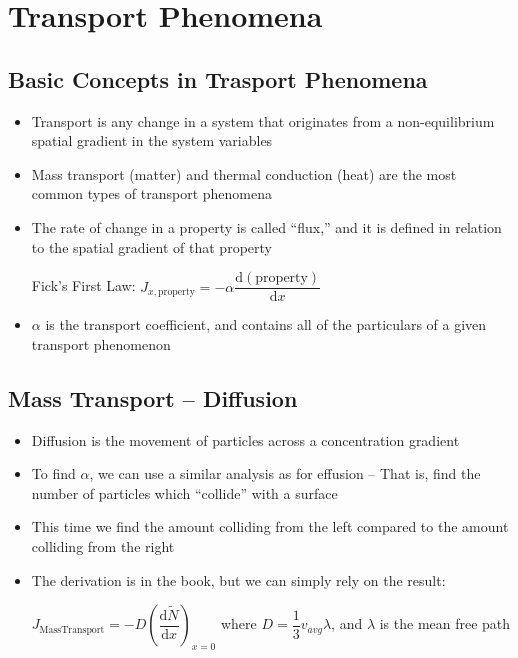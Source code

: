 \documentclass[12pt, openany, letterpaper]{memoir}
\begin{document}
\chapter{Transport Phenomena}
\section*{Basic Concepts in Trasport Phenomena}
\begin{itemize}
	\item Transport is any change in a system that originates from a non-equilibrium spatial gradient in the system variables
	\item Mass transport (matter) and thermal conduction (heat) are the most common types of transport phenomena
	\item The rate of change in a property is called ``flux,'' and it is defined in relation to the spatial gradient of that property

	Fick's First Law: $J_{x,\mathrm{property}} = -\alpha \dfrac{\mathrm{d} (\mathrm{property})}{\mathrm{d}x}$
	\item $\alpha$ is the transport coefficient, and contains all of the particulars of a given transport phenomenon
\end{itemize}
\section*{Mass Transport -- Diffusion}
\begin{itemize}
	\item Diffusion is the movement of particles across a concentration gradient
	\item To find $\alpha$, we can use a similar analysis as for effusion -- That is, find the number of particles which ``collide'' with a surface
	\item This time we find the amount colliding from the left compared to the amount colliding from the right
	\item The derivation is in the book, but we can simply rely on the result:
	
	$J_{\mathrm{Mass Transport}} = -D\left(\dfrac{\mathrm{d}\tilde{N}}{\mathrm{d}x}\right)_{x=0}$ where $D=\dfrac{1}{3}v_{avg}\lambda$, and $\lambda$ is the mean free path	
\end{itemize}
\end{document}
